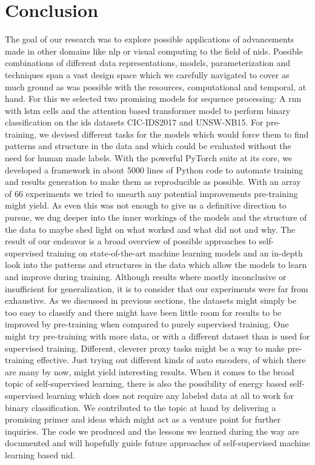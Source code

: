 \chapter{Conclusion} \label{sec:conclusion}

The goal of our research was to explore possible applications of advancements made in other domains like \gls{nlp} or visual computing to the field of \gls{nids}. Possible combinations of different data representations, models, parameterization and techniques span a vast design space which we carefully navigated to cover as much ground as was possible with the resources, computational and temporal, at hand. For this we selected two promising models for sequence processing: A \gls{rnn} with \gls{lstm} cells and the attention based transformer model to perform binary classification on the \gls{ids} datasets CIC-IDS2017 and UNSW-NB15. For pre-training, we devised different tasks for the models which would force them to find patterns and structure in the data and which could be evaluated without the need for human made labels. With the powerful PyTorch suite at its core, we developed a framework in about 5000 lines of Python code to automate training and results generation to make them as reproducible as possible. With an array of 66 experiments we tried to unearth any potential improvements pre-training might yield. As even this was not enough to give us a definitive direction to pursue, we dug deeper into the inner workings of the models and the structure of the data to maybe shed light on what worked and what did not and why. The result of our endeavor is a broad overview of possible approaches to self-supervised training on state-of-the-art machine learning models and an in-depth look into the patterns and structures in the data which allow the models to learn and improve during training. Although results where mostly inconclusive or insufficient for generalization, it is to consider that our experiments were far from exhaustive. As we discussed in previous sections, the datasets might simply be too easy to classify and there might have been little room for results to be improved by pre-training when compared to purely supervised training. One might try pre-training with more data, or with a different dataset than is used for supervised training. Different, cleverer proxy tasks might be a way to make pre-training effective. Just trying out different kinds of auto encoders, of which there are many by now, might yield interesting results. When it comes to the broad topic of self-supervised learning, there is also the possibility of energy based self-supervised learning which does not require any labeled data at all to work for binary classification. We contributed to the topic at hand by delivering a promising primer and ideas which might act as a venture point for further inquiries. The code we produced and the lessons we learned during the way are documented and will hopefully guide future approaches of self-supervised machine learning based \gls{nid}. 

\newpage